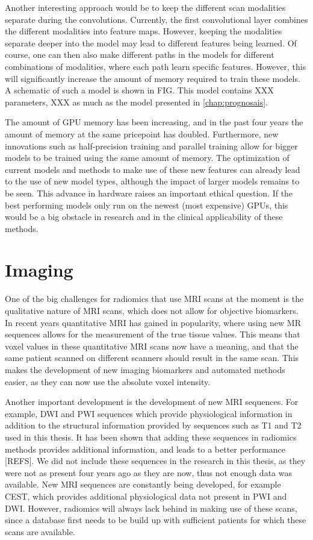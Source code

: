 Another interesting approach would be to keep the different scan modalities separate during the convolutions.
Currently, the first convolutional layer combines the different modalities into feature maps.
However, keeping the modalities separate deeper into the model may lead to different features being learned.
Of course, one can then also make different paths in the models for different combinations of modalities, where each path learn specific features.
However, this will significantly increase the amount of memory required to train these models.
A schematic of such a model is shown in FIG. This model contains XXX parameters, XXX as much as the model presented in \cref{chap:prognosais}.

The amount of GPU memory has been increasing, and in the past four years the amount of memory at the same pricepoint has doubled.
Furthermore, new innovations such as half-precision training and parallel training allow for bigger models to be trained using the same amount of memory.
The optimization of current models and methods to make use of these new features can already lead to the use of new model types, although the impact of larger models remains to be seen.
This advance in hardware raises an important ethical question.
If the best performing models only run on the newest (most expensive) GPUs, this would be a big obstacle in research and in the clinical applicability of these methods.

\section{Imaging}

One of the big challenges for radiomics that use \gls{MRI} scans at the moment is the qualitative nature of \gls{MRI} scans, which does not allow for objective biomarkers.
In recent years quantitative \gls{MRI} has gained in popularity, where using new \gls{MR} sequences allows for the measurement of the true tissue values.
This means that voxel values in these quantitative \gls{MRI} scans now have a meaning, and that the same patient scanned on different scanners should result in the same scan.
This makes the development of new imaging biomarkers and automated methods easier, as they can now use the absolute voxel intensity.

Another important development is the development of new \gls{MRI} sequences.
For example, \gls{DWI} and \gls{PWI} sequences which provide physiological information in addition to the structural information provided by sequences such as \gls{T1} and \gls{T2} used in this thesis.
It has been shown that adding these sequences in radiomics methods provides additional information, and leads to a better performance [REFS].
We did not include these sequences in the research in this thesis, as they were not as present four years ago as they are now, thus not enough data was available.
New \gls{MRI} sequences are constantly being developed, for example CEST, which provides additional physiological data not present in \gls{PWI} and \gls{DWI}.
However, radiomics will always lack behind in making use of these scans, since a database first needs to be build up with sufficient patients for which these scans are available.

